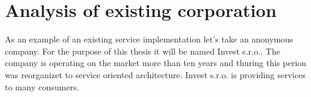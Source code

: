 \chapter{Analysis of existing corporation}

As an example of an existing service implementation let's take an anonymous company. For the purpose of this thesis it will be named Invest s.r.o.. The company is operating on the market more than ten years and thuring this perion was reorganizet to service oriented architecture. Invest s.r.o. is providing services to many consumers.


